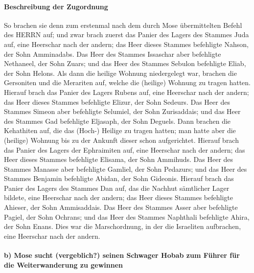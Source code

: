 \hypertarget{beschreibung-der-zugordnung}{%
\paragraph{Beschreibung der
Zugordnung}\label{beschreibung-der-zugordnung}}

So brachen sie denn zum erstenmal nach dem durch Mose
übermittelten Befehl des HERRN auf; und zwar brach zuerst
das Panier des Lagers des Stammes Juda auf, eine Heerschar nach der
andern; das Heer dieses Stammes befehligte Nahson, der Sohn Amminadabs.
Das Heer des Stammes Issaschar aber befehligte Nethaneel,
der Sohn Zuars; und das Heer des Stammes Sebulon
befehligte Eliab, der Sohn Helons. Als dann die heilige
Wohnung niedergelegt war, brachen die Gersoniten und die Merariten auf,
welche die (heilige) Wohnung zu tragen hatten. Hierauf
brach das Panier des Lagers Rubens auf, eine Heerschar nach der andern;
das Heer dieses Stammes befehligte Elizur, der Sohn Sedeurs.
Das Heer des Stammes Simeon aber befehligte Selumiel, der
Sohn Zurisaddais; und das Heer des Stammes Gad befehligte
Eljasaph, der Sohn Deguels. Dann brachen die Kehathiten
auf, die das (Hoch-) Heilige zu tragen hatten; man hatte aber die
(heilige) Wohnung bis zu der Ankunft dieser schon aufgerichtet.
Hierauf brach das Panier des Lagers der Ephraimiten auf,
eine Heerschar nach der andern; das Heer dieses Stammes befehligte
Elisama, der Sohn Ammihuds. Das Heer des Stammes Manasse
aber befehligte Gamliel, der Sohn Pedazurs; und das Heer
des Stammes Benjamin befehligte Abidan, der Sohn Gideonis.
Hierauf brach das Panier des Lagers des Stammes Dan auf,
das die Nachhut sämtlicher Lager bildete, eine Heerschar nach der
andern; das Heer dieses Stammes befehligte Ahieser, der Sohn
Ammisaddais. Das Heer des Stammes Asser aber befehligte
Pagiel, der Sohn Ochrans; und das Heer des Stammes
Naphthali befehligte Ahira, der Sohn Enans. Dies war die
Marschordnung, in der die Israeliten aufbrachen, eine Heerschar nach der
andern.

\hypertarget{b-mose-sucht-vergeblich-seinen-schwager-hobab-zum-fuxfchrer-fuxfcr-die-weiterwanderung-zu-gewinnen}{%
\paragraph{b) Mose sucht (vergeblich?) seinen Schwager Hobab zum Führer
für die Weiterwanderung zu
gewinnen}\label{b-mose-sucht-vergeblich-seinen-schwager-hobab-zum-fuxfchrer-fuxfcr-die-weiterwanderung-zu-gewinnen}}

